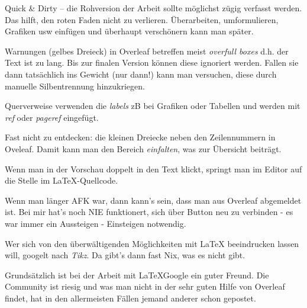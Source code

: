 Quick \& Dirty -- die Rohversion der Arbeit sollte möglichst zügig verfasst werden.
Das hilft, den roten Faden nicht zu verlieren.
Überarbeiten, umformulieren, Grafiken usw einfügen und überhaupt verschönern kann man später.

Warnungen (gelbes Dreieck) in Overleaf betreffen meist \textit{overfull boxes} d.h. der Text ist zu lang.
Bis zur finalen Version können diese ignoriert werden.
Fallen sie dann tatsächlich ins Gewicht (nur dann!) kann man versuchen, diese durch manuelle Silbentrennung hinzukriegen.

Querverweise verwenden die \textit{labels} zB bei Grafiken oder Tabellen und werden mit \textit{ref} oder \textit{pageref} eingefügt.

Fast nicht zu entdecken: die kleinen Dreiecke neben den Zeilennummern in Oveleaf.
Damit kann man den Bereich \textit{einfalten}, was zur Übersicht beiträgt.

Wenn man in der Vorschau doppelt in den Text klickt, springt man im Editor auf die Stelle im LaTeX-Quellcode.

Wenn man länger AFK war, dann kann's sein, dass man aus Overleaf abgemeldet ist.
Bei mir hat's noch NIE funktionert, sich über Button neu zu verbinden - es war immer ein Aussteigen - Einsteigen notwendig.

Wer sich von den überwältigenden Möglichkeiten mit LaTeX beeindrucken lassen will, googelt nach \textit{Tikz}.
Da gibt's dann fast Nix, was es nicht gibt.

Grundsätzlich ist bei der Arbeit mit \LaTeX Google ein guter Freund.
Die Community ist riesig und was man nicht in der sehr guten Hilfe von Overleaf findet, hat in den allermeisten Fällen jemand anderer schon gepostet.








